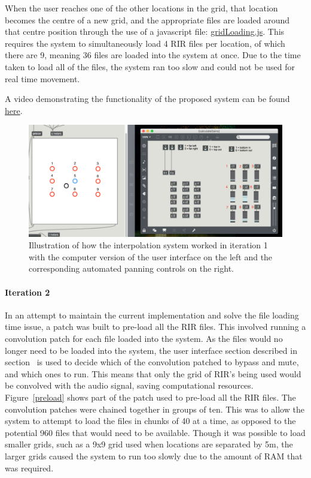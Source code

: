 \documentclass[../../main.tex]{subfiles}
\begin{document}
		 	When the user reaches one of the other locations in the grid, that location becomes the centre of a new grid, and the appropriate files are loaded around that centre position through the use of a javascript file: \href{http://lt669.github.io/code/javascript/html/gridLoading.html}{gridLoading.js}. This requires the system to simultaneously load 4 \ac{RIR} files per location, of which there are 9, meaning 36 files are loaded into the system at once. Due to the time taken to load all of the files, the system ran too slow and could not be used for real time movement.

		 	A video demonstrating the functionality of the proposed system can be found \href{http://lt669.github.io/pages/videos.html}{here}.

			\begin{figure}[H]
				\centerline{\includegraphics[width=\textwidth]{Sections/Implementation/Max/images/Max/iteration1/panning_edit2.png}}
				\caption{Illustration of how the interpolation system worked in iteration 1 with the computer version of the user interface on the left and the corresponding automated panning controls on the right.}
				\label{iteration1Panning}
			\end{figure}


		 \paragraph{Iteration 2}

		 	In an attempt to maintain the current implementation and solve the file loading time issue, a patch was built to pre-load all the \ac{RIR} files. This involved running a convolution patch for each file loaded into the system. As the files would no longer need to be loaded into the system, the user interface section described in section~ is used to decide which of the convolution patched to bypass and mute, and which ones to run. This means that only the grid of \ac{RIR}'s being used would be convolved with the audio signal, saving computational resources. Figure~\ref{preload} shows part of the patch used to pre-load all the \ac{RIR} files. The convolution patches were chained together in groups of ten. This was to allow the system to attempt to load the files in chunks of 40 at a time, as opposed to the potential 960 files that would need to be available. Though it was possible to load smaller grids, such as a 9x9 grid used when locations are separated by 5m, the larger grids caused the system to run too slowly due to the amount of RAM that was required.
\end{document}
